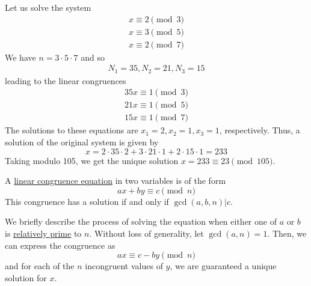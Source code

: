 \documentclass{article}
\newcounter{theorem}[section]
\newcounter{definition}[section]
\newcounter{example}[section]
\begin{document}
\begin{example}
  \label{ex:chinese-remainder-theorem-computation}
Let us solve the system 
\begin{align*}
    x \equiv 2 \pmod{3} \\
    x \equiv 3 \pmod{5} \\
    x \equiv 2 \pmod{7}
\end{align*}
We have $n = 3 \cdot 5 \cdot 7$ and so
\begin{align*}
    N_1 = 35, N_2 = 21, N_3 = 15
\end{align*}
leading to the linear congruences
\begin{align*}
    35x \equiv 1 \pmod{3} \\
    21 x \equiv 1 \pmod{5} \\
    15 x \equiv 1 \pmod{7}
\end{align*}
The solutions to these equations are $x_1 = 2, x_2 = 1, x_3 = 1$, respectively. Thus, a solution of the original system is given by 
\begin{equation}
  x = 2 \cdot 35 \cdot 2 + 3 \cdot 21 \cdot 1 + 2 \cdot 15 \cdot 1 = 233
\end{equation}
Taking modulo 105, we get the unique solution $x = 233 \equiv 23 \pmod{105}$. 
\end{example}

\begin{definition}
  \label{def:linear-congruence-in-two-variables}
A \hyperref[def:linear-congruence-equation]{linear congruence equation} in two variables is of the form 
\begin{equation}
  ax + by \equiv c \pmod{n}
\end{equation}
This congruence has a solution if and only if $\gcd(a, b, n) | c$. 
\end{definition}

We briefly describe the process of solving the equation when either one of $a$ or $b$ is \hyperref[def:relatively-prime]{relatively prime} to $n$. Without loss of generality, let $\gcd(a, n) = 1$. Then, we can express the congruence as 
\begin{equation}
  ax \equiv c - by \pmod{n}
\end{equation}
and for each of the $n$ incongruent values of $y$, we are guaranteed a unique solution for $x$. 
\end{document}
